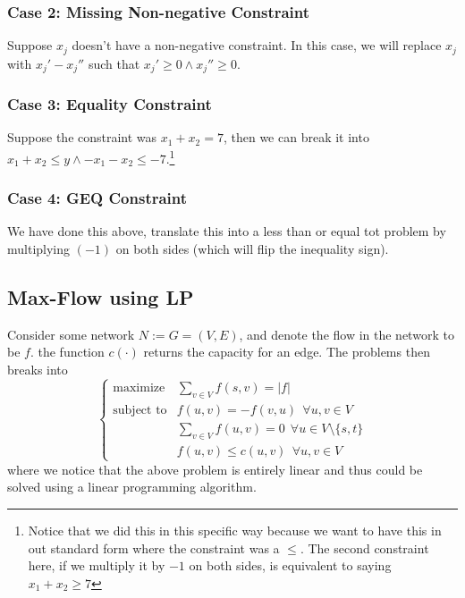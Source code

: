 \documentclass[10pt]{article}
\begin{document}
\subsubsection{Case 2: Missing Non-negative Constraint} Suppose $x_j$ doesn't have a non-negative constraint. In this case, we will replace $x_j$ with $x_j' - x_j''$ such that $x_j' \geq 0\land x_j'' \geq 0$. 
\subsubsection{Case 3: Equality Constraint} Suppose the constraint was $x_1 + x_2 = 7$, then we can break it into $x_1 + x_2 \leq y \land -x_1 - x_2 \leq -7$.\footnote{Notice that we did this in this specific way because we want to have this in out standard form where the constraint was a $\leq$. The second constraint here, if we multiply it by $-1$ on both sides, is equivalent to saying $x_1+x_2 \geq 7$}
\subsubsection{Case 4: GEQ Constraint} We have done this above, translate this into a less than or equal tot problem by multiplying $(-1)$ on both sides (which will flip the inequality sign).

\subsection{Max-Flow using LP}
Consider some network $N:= G = (V,E)$, and denote the flow in the network to be $f$. the function $c(\cdot)$ returns the capacity for an edge. The problems then breaks into
$$
\begin{cases}
    \text{maximize} &\sum_{v\in V} f(s,v) = |f| \\
    \text{subject to} &f(u,v) = -f(v,u)~~\forall u, v \in V \\
    &\sum_{v\in V}f(u,v) = 0 ~~\forall u \in V\setminus\{s, t\} \\
    &f(u,v) \leq c(u,v) ~~\forall u,v \in V
\end{cases}
$$
where we notice that the above problem is entirely linear and thus could be solved using a linear programming algorithm.
\end{document}
